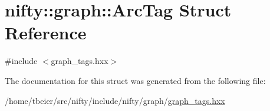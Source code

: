 \hypertarget{structnifty_1_1graph_1_1ArcTag}{}\section{nifty\+:\+:graph\+:\+:Arc\+Tag Struct Reference}
\label{structnifty_1_1graph_1_1ArcTag}


{\ttfamily \#include $<$graph\+\_\+tags.\+hxx$>$}



The documentation for this struct was generated from the following file\+:\begin{DoxyCompactItemize}
\item 
/home/tbeier/src/nifty/include/nifty/graph/\hyperlink{graph__tags_8hxx}{graph\+\_\+tags.\+hxx}\end{DoxyCompactItemize}
